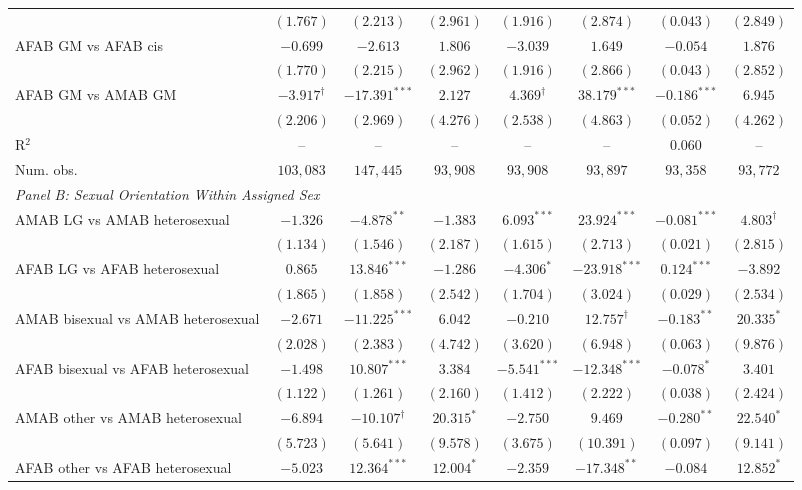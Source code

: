 \begin{table}[htpb!]
{\begin{tabular}{l c c c c c c c}
 & $(1.767)$ & $(2.213)$ & $(2.961)$ & $(1.916)$ & $(2.874)$ & $(0.043)$ & $(2.849)$ \\
AFAB GM vs AFAB cis & $-0.699$ & $-2.613$ & $1.806$ & $-3.039$ & $1.649$ & $-0.054$ & $1.876$ \\
 & $(1.770)$ & $(2.215)$ & $(2.962)$ & $(1.916)$ & $(2.866)$ & $(0.043)$ & $(2.852)$ \\
AFAB GM vs AMAB GM & $-3.917^{\dagger}$ & $-17.391^{***}$ & $2.127$ & $4.369^{\dagger}$ & $38.179^{***}$ & $-0.186^{***}$ & $6.945$ \\
 & $(2.206)$ & $(2.969)$ & $(4.276)$ & $(2.538)$ & $(4.863)$ & $(0.052)$ & $(4.262)$ \\
\hline
R$^2$ & -- & -- & -- & -- & -- & $0.060$ & -- \\
Num. obs. & $103,083$ & $147,445$ & $93,908$ & $93,908$ & $93,897$ & $93,358$ & $93,772$ \\
\hline
\multicolumn{8}{l}{\textit{Panel B: Sexual Orientation Within Assigned Sex}} \\
AMAB LG vs AMAB heterosexual & $-1.326$ & $-4.878^{**}$ & $-1.383$ & $6.093^{***}$ & $23.924^{***}$ & $-0.081^{***}$ & $4.803^{\dagger}$ \\
 & $(1.134)$ & $(1.546)$ & $(2.187)$ & $(1.615)$ & $(2.713)$ & $(0.021)$ & $(2.815)$ \\
AFAB LG vs AFAB heterosexual & $0.865$ & $13.846^{***}$ & $-1.286$ & $-4.306^{*}$ & $-23.918^{***}$ & $0.124^{***}$ & $-3.892$ \\
 & $(1.865)$ & $(1.858)$ & $(2.542)$ & $(1.704)$ & $(3.024)$ & $(0.029)$ & $(2.534)$ \\
AMAB bisexual vs AMAB heterosexual & $-2.671$ & $-11.225^{***}$ & $6.042$ & $-0.210$ & $12.757^{\dagger}$ & $-0.183^{**}$ & $20.335^{*}$ \\
 & $(2.028)$ & $(2.383)$ & $(4.742)$ & $(3.620)$ & $(6.948)$ & $(0.063)$ & $(9.876)$ \\
AFAB bisexual vs AFAB heterosexual & $-1.498$ & $10.807^{***}$ & $3.384$ & $-5.541^{***}$ & $-12.348^{***}$ & $-0.078^{*}$ & $3.401$ \\
 & $(1.122)$ & $(1.261)$ & $(2.160)$ & $(1.412)$ & $(2.222)$ & $(0.038)$ & $(2.424)$ \\
AMAB other vs AMAB heterosexual & $-6.894$ & $-10.107^{\dagger}$ & $20.315^{*}$ & $-2.750$ & $9.469$ & $-0.280^{**}$ & $22.540^{*}$ \\
 & $(5.723)$ & $(5.641)$ & $(9.578)$ & $(3.675)$ & $(10.391)$ & $(0.097)$ & $(9.141)$ \\
AFAB other vs AFAB heterosexual & $-5.023$ & $12.364^{***}$ & $12.004^{*}$ & $-2.359$ & $-17.348^{**}$ & $-0.084$ & $12.852^{*}$ \\

\end{tabular}}
\end{table}
